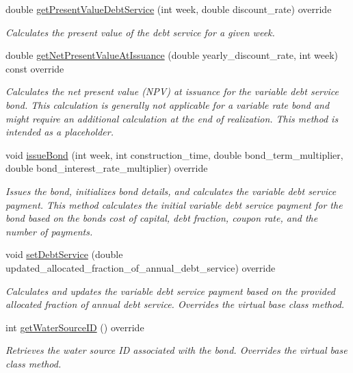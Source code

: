 \begin{DoxyCompactItemize}
double \mbox{\hyperlink{classVariableDebtServiceBond_aa5ad4fcc7c65154105388b332ae98198}{get\+Present\+Value\+Debt\+Service}} (int week, double discount\+\_\+rate) override
\begin{DoxyCompactList}\small\item\em Calculates the present value of the debt service for a given week. \end{DoxyCompactList}\item 
double \mbox{\hyperlink{classVariableDebtServiceBond_a8cc7ee442d788b91b8c00e6bed07644d}{get\+Net\+Present\+Value\+At\+Issuance}} (double yearly\+\_\+discount\+\_\+rate, int week) const override
\begin{DoxyCompactList}\small\item\em Calculates the net present value (N\+PV) at issuance for the variable debt service bond. This calculation is generally not applicable for a variable rate bond and might require an additional calculation at the end of realization. This method is intended as a placeholder. \end{DoxyCompactList}\item 
void \mbox{\hyperlink{classVariableDebtServiceBond_a7d91921482f01d9bb37dba6e6d085771}{issue\+Bond}} (int week, int construction\+\_\+time, double bond\+\_\+term\+\_\+multiplier, double bond\+\_\+interest\+\_\+rate\+\_\+multiplier) override
\begin{DoxyCompactList}\small\item\em Issues the bond, initializes bond details, and calculates the variable debt service payment. This method calculates the initial variable debt service payment for the bond based on the bond\textquotesingle{}s cost of capital, debt fraction, coupon rate, and the number of payments. \end{DoxyCompactList}\item 
void \mbox{\hyperlink{classVariableDebtServiceBond_a692563150053b280f6e1ef23fd47c117}{set\+Debt\+Service}} (double updated\+\_\+allocated\+\_\+fraction\+\_\+of\+\_\+annual\+\_\+debt\+\_\+service) override
\begin{DoxyCompactList}\small\item\em Calculates and updates the variable debt service payment based on the provided allocated fraction of annual debt service. Overrides the virtual base class method. \end{DoxyCompactList}\item 
int \mbox{\hyperlink{classVariableDebtServiceBond_a3edee29f26e8ac74f9767770c6a951c9}{get\+Water\+Source\+ID}} () override
\begin{DoxyCompactList}\small\item\em Retrieves the water source ID associated with the bond. Overrides the virtual base class method. \end{DoxyCompactList}\end{DoxyCompactItemize}
